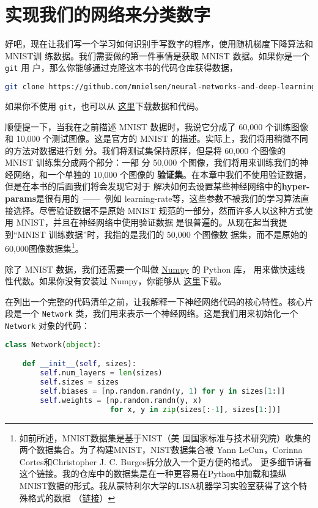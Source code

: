 \section{实现我们的网络来分类数字}
\label{sec:implementing_our_network_to_classify_digits}

好吧，现在让我们写一个学习如何识别手写数字的程序，使用随机梯度下降算法和 MNIST训
练数据。我们需要做的第一件事情是获取 MNIST 数据。如果你是一个 \lstinline!git! 用
户，那么你能够通过克隆这本书的代码仓库获得数据，

\begin{lstlisting}[language=sh]
git clone https://github.com/mnielsen/neural-networks-and-deep-learning.git
\end{lstlisting}

如果你不使用 \lstinline!git!，也可以从%
\href{https://github.com/mnielsen/neural-networks-and-deep-learning/archive/master.zip}{
  这里}下载数据和代码。

顺便提一下，当我在之前描述 MNIST 数据时，我说它分成了 60,000 个训练图像和 10,000
个测试图像。这是官方的 MNIST 的描述。实际上，我们将用稍微不同的方法对数据进行划
分。我们将测试集保持原样，但是将 60,000 个图像的 MNIST 训练集分成两个部分：一部
分 50,000 个图像，我们将用来训练我们的神经网络，和一个单独的 10,000 个图像的%
\textbf{验证集}。在本章中我们不使用验证数据，但是在本书的后面我们将会发现它对于
解决如何去设置某些神经网络中的\textbf{\gls{hyper-params}}是很有用的~——~例如%
\gls*{learning-rate}等，这些参数不被我们的学习算法直接选择。尽管验证数据不是原始
MNIST 规范的一部分，然而许多人以这种方式使用 MNIST，并且在神经网络中使用验证数据
是很普遍的。从现在起当我提到“MNIST 训练数据”时，我指的是我们的 50,000 个图像数
据集，而不是原始的 60,000图像数据集\footnote{如前所述，MNIST数据集是基于NIST（美
    国国家标准与技术研究院）收集的两个数据集合。为了构建MNIST，NIST数据集合被
  Yann LeCun，Corinna Cortes和Christopher J. C. Burges拆分放入一个更方便的格式。
  更多细节请看这个链接。我的仓库中的数据集是在一种更容易在Python中加载和操纵
  MNIST数据的形式。我从蒙特利尔大学的LISA机器学习实验室获得了这个特殊格式的数据
  （\href{http://www.deeplearning.net/tutorial/gettingstarted.html}{链接}）}。

除了 MNIST 数据，我们还需要一个叫做 \href{http://numpy.org/}{Numpy} 的 Python 库，
用来做快速线性代数。如果你没有安装过 Numpy，你能够从%
\href{http://www.scipy.org/install.html}{这里}下载。

在列出一个完整的代码清单之前，让我解释一下神经网络代码的核心特性。核心片段是一个
\lstinline!Network! 类，我们用来表示一个神经网络。这是我们用来初始化一个
\lstinline!Network! 对象的代码：
\begin{lstlisting}[language=Python]
class Network(object):

	def __init__(self, sizes):
		self.num_layers = len(sizes)
		self.sizes = sizes
		self.biases = [np.random.randn(y, 1) for y in sizes[1:]]
		self.weights = [np.random.randn(y, x)
						for x, y in zip(sizes[:-1], sizes[1:])]
\end{lstlisting}

